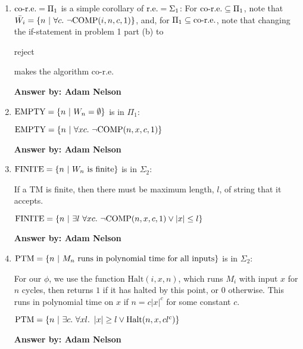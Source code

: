 \documentclass[12pt]{article}
\begin{document}
\begin{enumerate}
    {\bf Answer by: Adam Nelson}

  \item $\text{co-r.e.} = \Pi_1$ is a simple corollary of $\text{r.e.} = \Sigma_1$: For
    $\text{co-r.e.} \subseteq \Pi_1$, note that $\bar{W_i} = \left\{ n ~|~ \forall c.~\lnot\text{COMP}(i,n,c,1) \right\}$, and, for $\Pi_1 \subseteq \text{co-r.e.}$,
    note that changing the if-statement in problem 1 part (b) to
    \begin{algorithmic}
        \STATE reject
      \ENDIF
    \end{algorithmic}
    makes the algorithm co-r.e.

    {\bf Answer by: Adam Nelson}

  \item $\text{EMPTY} = \left\{ n ~|~ W_n = \emptyset \right\}$ is in $\Pi_1$:

    $\text{EMPTY} = \left\{ n ~|~ \forall x c.~\lnot\text{COMP}(n,x,c,1) \right\}$

    {\bf Answer by: Adam Nelson}

  \item $\text{FINITE} = \left\{ n ~|~ W_n~\text{is finite} \right\}$ is in $\Sigma_2$:

    If a TM is finite, then there must be maximum length, $l$, of string that
    it accepts.

    $\text{FINITE} = \left\{ n ~|~ \exists l~\forall x c.~\lnot\text{COMP}(n,x,c,1)
      \lor \left|x\right| \le l \right\}$

    {\bf Answer by: Adam Nelson}

  \item $\text{PTM} = \left\{ n ~|~ M_n~\text{runs in polynomial time for all inputs} \right\}$
    is in $\Sigma_2$:

    For our $\phi$, we use the function $\text{Halt}(i,x,n)$, which runs $M_i$
    with input $x$ for $n$ cycles, then returns $1$ if it has halted by this
    point, or $0$ otherwise. This runs in polynomial time on $x$ if
    $n = c\left|x\right|^c$ for some constant $c$.

    $\text{PTM} = \left\{ n ~|~ \exists c.~\forall x l.~\left|x\right| \ge l 
      \lor \text{Halt}(n,x,cl^c) \right\}$

    {\bf Answer by: Adam Nelson}

\end{enumerate}
\end{document}
